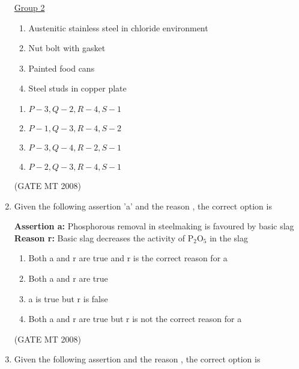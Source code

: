 \documentclass[11pt, letterpaper]{article}
\theoremstyle{remark}
\begin{document}
\begin{enumerate}[label=Q.\arabic*]
\begin{multicols}{2}
     \underline{Group 2}
    \begin{enumerate}[label=(\arabic*), start=1]
        \item Austenitic stainless steel in chloride environment
        \item Nut bolt with gasket
        \item Painted food cans
        \item Steel studs in copper plate
    \end{enumerate}
\end{multicols}
\vspace{-2em}       
    \begin{multicols}{2}
        \begin{enumerate}[label=(\MakeUppercase{\alph*})]
            \item $P-3, Q-2, R-4, S-1$
            \item $P-1, Q-3, R-4, S-2$
            \item $P-3, Q-4, R-2, S-1$
            \item $P-2, Q-3, R-4, S-1$
        \end{enumerate}
    \end{multicols}
\hfill(GATE MT 2008)

\item Given the following assertion 'a' and the reason , the correct option is
    
    \textbf{Assertion a:} Phosphorous removal in steelmaking is favoured by basic slag \\
    \textbf{Reason r:} Basic slag decreases the activity of P$_2$O$_5$ in the slag
    
    \begin{multicols}{2}
        \begin{enumerate}[label=(\MakeUppercase{\alph*})]
            \item Both a and r are true and r is the correct reason for a
            \item Both a and r are true
            \item a is true but r is false
            \item Both a and r are true but r is not the correct reason for a
        \end{enumerate}
    \end{multicols}
  \hfill(GATE MT 2008)
    \item Given the following assertion  and the reason , the correct option is
    

\end{enumerate}
\end{document}
